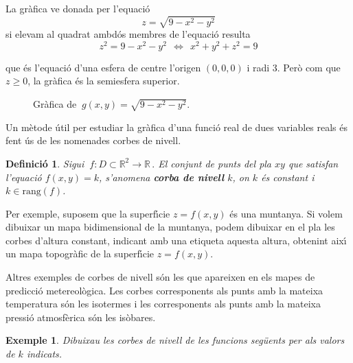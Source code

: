 \documentclass[12pt]{article}
\newtheorem{definicio}{Definici{\'o}}[subsection]
\newtheorem{exemple}{Exemple}[subsection]
\newcommand{\R}{\mathbb{R}}
\begin{document}
La gr{\`a}fica ve donada per l'equaci{\'o}
\[
 z=\sqrt{9-x^2-y^2}
\]
si elevam al quadrat ambd{\'o}s membres de l'equaci{\'o} resulta
\[
z^2 = 9-x^2-y^2\,\; \Longleftrightarrow\,\; x^2+y^2+z^2=9
\]


que {\'e}s l'equaci{\'o} d'una esfera de centre l'origen $(0,0,0)$ i
radi 3. Per{\`o} com que $z\geq 0$, la gr{\`a}fica {\'e}s la semiesfera
superior.
\begin{figure}[h!]
\begin{center}
\vspace{-.8cm}
\end{center}\caption{Gr{\`a}fica de  $\ g(x,y)=\sqrt{9-x^2-y^2}$.}
\end{figure}


\vspace{1cm}
Un m{\`e}tode {\'u}til per estudiar la
gr{\`a}fica d'una funci{\'o} real de dues variables reals {\'e}s fent
{\'u}s de les nomenades corbes de nivell.

\begin{definicio}
Sigui $\ f:D\subset \R^2\longrightarrow \R\,.$ El conjunt de
punts del pla $xy$ que satisfan l'equaci{\'o} $f(x,y)=k$, s'anomena
\textbf{corba de nivell} $k$, on $k$ {\'e}s constant i $k\in\mbox{rang}(f)$.
\end{definicio}



Per exemple, suposem que la superf{\'\i}cie $z=f(x,y)$ {\'e}s una
muntanya. Si volem dibuixar un mapa bidimensional de la muntanya, podem dibuixar en el pla les corbes d'altura constant, indicant amb
una etiqueta aquesta altura, obtenint aix{\'\i} un mapa
topogr{\`a}fic de la superf{\'\i}cie $z=f(x,y)$.

Altres exemples de corbes de nivell s{\'o}n les que apareixen en els
mapes de predicci{\'o} metereol{\`o}gica. Les corbes corresponents als
punts amb la mateixa temperatura s{\'o}n les isotermes i les
corresponents als punts amb la mateixa pressi{\'o} atmosf{\`e}rica
s{\'o}n les is{\`o}bares.

\vspace*{0.4 cm}
\begin{exemple}
Dibuixau les corbes de nivell de les funcions seg{\"u}ents per als
valors de $k$ indicats.
\end{exemple}
\end{document}

